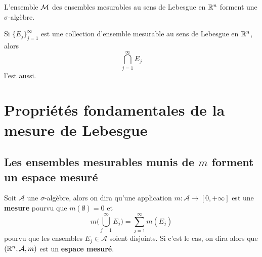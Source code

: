 

\begin{theoreme}
	L'ensemble $\mathcal M$ des ensembles mesurables au sens de Lebesgue en $\mathbb{R}^n$ forment une $\sigma$-algèbre.
\end{theoreme}


\begin{corollaire}
	Si $\{E_j\}_{j=1}^\infty$ est une collection d'ensemble mesurable au sens de Lebesgue en $\mathbb{R}^n$, alors
	\[
	\bigcap_{j=1}^\infty E_j
	\]
	l'est aussi.
\end{corollaire}


\section{Propriétés fondamentales de la mesure de Lebesgue}

\subsection{Les ensembles mesurables munis de $m$ forment un espace mesuré}
\begin{definition}
	Soit $\mathcal A$ une $\sigma$-algèbre, alors on dira qu'une application $m : \mathcal A \to [0, +\infty]$ est une \textbf{mesure} pourvu que $m(\emptyset) = 0$ et 
	\[
	m \Bigg(\bigcup_{j=1}^\infty E_j\Bigg) = \sum_{j=1}^\infty m(E_j)
	\]
	pourvu que les ensembles $E_j \in \mathcal A$ soient disjoints. Si c'est le cas, on dira alors que $(\mathbb{R}^n, \mathcal A, m)$ est un \textbf{espace mesuré}.
\end{definition}

